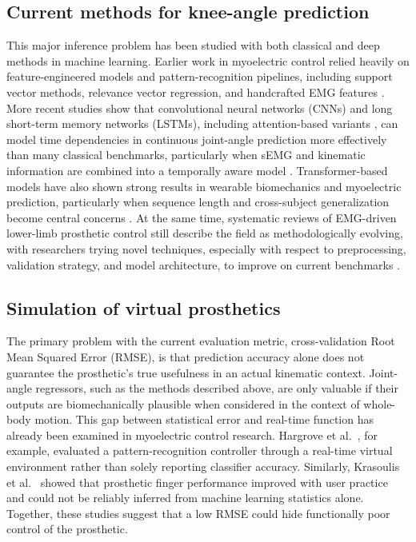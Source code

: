 \documentclass[referee,lineno,pdflatex,sn-vancouver-num]{sn-jnl}
\begin{document}
\subsection{Current methods for knee-angle prediction}
This major inference problem has been studied with both classical and deep methods in machine learning. Earlier work in myoelectric control relied heavily on feature-engineered models and pattern-recognition pipelines, including support vector methods, relevance vector regression, and handcrafted EMG features \cite{hudgins1993,hargrove2007,lihb2023}. More recent studies show that convolutional neural networks (CNNs) and long short-term memory networks (LSTMs), including attention-based variants \cite{mollahossein2025}, can model time dependencies in continuous joint-angle prediction more effectively than many classical benchmarks, particularly when sEMG and kinematic information are combined into a temporally aware model \cite{sun2022,yi2022,zhang2022,zhu2022,moghadam2023,keles2023}. Transformer-based models have also shown strong results in wearable biomechanics and myoelectric prediction, particularly when sequence length and cross-subject generalization become central concerns \cite{zerveas2021,liang2023,lix2023,linhe2024,lin2025a}. At the same time, systematic reviews of EMG-driven lower-limb prosthetic control still describe the field as methodologically evolving, with researchers trying novel techniques, especially with respect to preprocessing, validation strategy, and model architecture, to improve on current benchmarks \cite{cimolato2022,ahkami2023}.

\subsection{Simulation of virtual prosthetics}
The primary problem with the current evaluation metric, cross-validation Root Mean Squared Error (RMSE), is that prediction accuracy alone does not guarantee the prosthetic's true usefulness in an actual kinematic context. Joint-angle regressors, such as the methods described above, are only valuable if their outputs are biomechanically plausible when considered in the context of whole-body motion. This gap between statistical error and real-time function has already been examined in myoelectric control research. Hargrove et al.\ \cite{hargrove2007}, for example, evaluated a pattern-recognition controller through a real-time virtual environment rather than solely reporting classifier accuracy. Similarly, Krasoulis et al.\ \cite{krasoulis2019} showed that prosthetic finger performance improved with user practice and could not be reliably inferred from machine learning statistics alone. Together, these studies suggest that a low RMSE could hide functionally poor control of the prosthetic.
\end{document}
